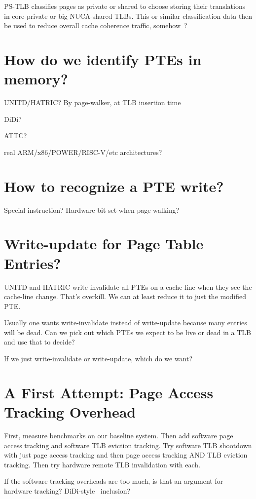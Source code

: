 PS-TLB \cite{li_ps-tlb_2013, li_leveraging_2012} classifies pages as private or shared to choose storing their translations in core-private or big NUCA-shared TLBs. This or similar classification data then be used to reduce overall cache coherence traffic, somehow~\cite{esteve_tlb-based_2017}?

\section{How do we identify PTEs in memory?}

UNITD/HATRIC? By page-walker, at TLB insertion time

DiDi?

ATTC?

real ARM/x86/POWER/RISC-V/etc architectures?

\section{How to recognize a PTE write?}

Special instruction? Hardware bit set when page walking?

\section{Write-update for Page Table Entries?}

UNITD and HATRIC write-invalidate all PTEs on a cache-line when they see the cache-line change. That's overkill. We can at least reduce it to just the modified PTE.

Usually one wants write-invalidate instead of write-update because many entries will be dead. Can we pick out which PTEs we expect to be live or dead in a TLB and use that to decide?

If we just write-invalidate or write-update, which do we want?

\section{A First Attempt: Page Access Tracking Overhead}
First, measure benchmarks on our baseline system. Then add software page access tracking and software TLB eviction tracking. Try software TLB shootdown with just page access tracking and then page access tracking AND TLB eviction tracking. Then try hardware remote TLB invalidation with each.

If the software tracking overheads are too much, is that an argument for hardware tracking? DiDi-style~\cite{villavieja_didi_2011} inclusion?

\endinput